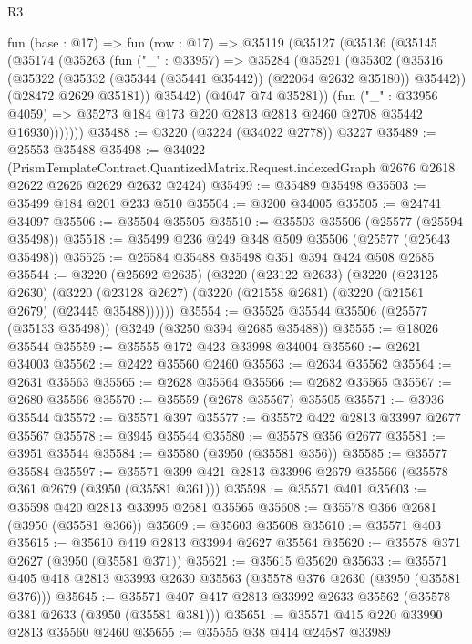 \begin{lexlean}{R3}
\begin{coremodule}
    fun (base : @17) =>
    fun (row : @17) =>
    @35119
      (@35127
        (@35136
          (@35145
            (@35174
              (@35263
                (fun ("_" : @33957) =>
                @35284
                  (@35291
                    (@35302
                      (@35316
                        (@35322 (@35332 (@35344 (@35441 @35442)) (@22064 @2632 @35180)) @35442))
                      (@28472 @2629 @35181))
                    @35442)
                  (@4047 @74 @35281))
                (fun ("_" : @33956 @4059) =>
                @35273 @184 @173 @220 @2813 @2813 @2460 @2708 @35442 @16930)))))))
@35488 := @3220 (@3224 (@34022 @2778)) @3227
@35489 := @25553 @35488
@35498 := @34022
    (PrismTemplateContract.QuantizedMatrix.Request.indexedGraph
      @2676
      @2618
      @2622
      @2626
      @2629
      @2632
      @2424)
@35499 := @35489 @35498
@35503 := @35499 @184 @201 @233 @510
@35504 := @3200 @34005
@35505 := @24741 @34097
@35506 := @35504 @35505
@35510 := @35503 @35506 (@25577 (@25594 @35498))
@35518 := @35499 @236 @249 @348 @509 @35506 (@25577 (@25643 @35498))
@35525 := @25584 @35488 @35498 @351 @394 @424 @508 @2685
@35544 := @3220
    (@25692 @2635)
    (@3220
      (@23122 @2633)
      (@3220
        (@23125 @2630)
        (@3220 (@23128 @2627) (@3220 (@21558 @2681) (@3220 (@21561 @2679) (@23445 @35488))))))
@35554 := @35525 @35544 @35506 (@25577 (@35133 @35498)) (@3249 (@3250 @394 @2685 @35488))
@35555 := @18026 @35544
@35559 := @35555 @172 @423 @33998 @34004
@35560 := @2621 @34003
@35562 := @2422 @35560 @2460
@35563 := @2634 @35562
@35564 := @2631 @35563
@35565 := @2628 @35564
@35566 := @2682 @35565
@35567 := @2680 @35566
@35570 := @35559 (@2678 @35567) @35505
@35571 := @3936 @35544
@35572 := @35571 @397
@35577 := @35572 @422 @2813 @33997 @2677 @35567
@35578 := @3945 @35544
@35580 := @35578 @356 @2677
@35581 := @3951 @35544
@35584 := @35580 (@3950 (@35581 @356))
@35585 := @35577 @35584
@35597 := @35571 @399 @421 @2813 @33996 @2679 @35566 (@35578 @361 @2679 (@3950 (@35581 @361)))
@35598 := @35571 @401
@35603 := @35598 @420 @2813 @33995 @2681 @35565
@35608 := @35578 @366 @2681 (@3950 (@35581 @366))
@35609 := @35603 @35608
@35610 := @35571 @403
@35615 := @35610 @419 @2813 @33994 @2627 @35564
@35620 := @35578 @371 @2627 (@3950 (@35581 @371))
@35621 := @35615 @35620
@35633 := @35571 @405 @418 @2813 @33993 @2630 @35563 (@35578 @376 @2630 (@3950 (@35581 @376)))
@35645 := @35571 @407 @417 @2813 @33992 @2633 @35562 (@35578 @381 @2633 (@3950 (@35581 @381)))
@35651 := @35571 @415 @220 @33990 @2813 @35560 @2460
@35655 := @35555 @38 @414 @24587 @33989

\end{coremodule}
\end{lexlean}
